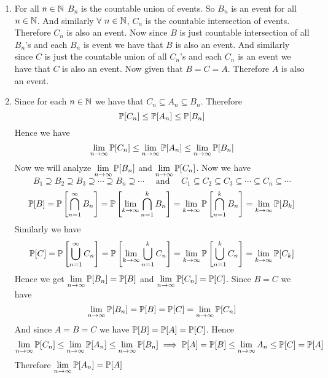 \documentclass[a4paper, 11pt]{article}
\begin{document}
{\begin{enumerate}[label=(\alph*)]
		\item For all $n\in\mathbb{N}$ $B_n$ is the countable union of events. So $B_n$ is an event for all $n\in\mathbb{N}$. And similarly $\forall\ n\in\mathbb{N}$, $C_n$ is the countable intersection of events. Therefore $C_n$ is also an event. Now since $B$ is just countable intersection of all $B_n$'s and each $B_n$ is event we have that $B$ is also an event. And similarly since $C$ is just the countable union of all $C_n$'s and each $C_n$ is an event we have that $C$ is also an event. Now given that $B=C=A$. Therefore $A$ is also an event.
		\item Since for each $n\in \mathbb{N}$ we have that $C_n\subseteq A_n\subseteq B_n$. Therefore $$\mathbb{P}[C_n]\leq \mathbb{P}[A_n]\leq \mathbb{P}[B_n]$$Hence we have $$\lim_{n\to\infty}\mathbb{P}[C_n]\leq\lim_{n\to\infty}\mathbb{P}[A_n]\leq \lim_{n\to\infty}\mathbb{P}[B_n]$$Now we will analyze $\lim\limits_{n\to\infty}\mathbb{P}[B_n]$ and $\lim\limits_{n\to \infty}\mathbb{P}[C_n]$. Now we have $$B_1\supseteq B_2\supseteq B_3\supseteq \cdots\supseteq B_n\supseteq \cdots\quad\text{ and }\quad C_1\subseteq C_2\subseteq C_3\subseteq \cdots\subseteq C_n\subseteq \cdots$$ \begin{align*}
			\mathbb{P}[B]=\mathbb{P}\left[\bigcap_{n=1}^{\infty}B_n \right]=\mathbb{P}\left[ \lim_{k\to\infty}\bigcap_{n=1}^kB_n \right]=\lim_{k\to\infty}\mathbb{P}\left[ \bigcap_{n=1}^kB_n \right]=\lim_{k\to\infty}\mathbb{P}[B_k]
		\end{align*}Similarly we have \begin{align*}
		\mathbb{P}[C]=\mathbb{P}\left[\bigcup_{n=1}^{\infty}C_n \right]=\mathbb{P}\left[ \lim_{k\to\infty}\bigcup_{n=1}^kC_n \right]=\lim_{k\to\infty}\mathbb{P}\left[ \bigcup_{n=1}^kC_n \right]=\lim_{k\to\infty}\mathbb{P}[C_k]
	\end{align*}Hence we get $\lim\limits_{n\to\infty}\mathbb{P}[B_n]=\mathbb{P}[B]$ and $\lim\limits_{n\to\infty}\mathbb{P}[C_n]=\mathbb{P}[C]$. Since $B=C$ we have $$\lim\limits_{n\to\infty}\mathbb{P}[B_n]=\mathbb{P}[B]=\mathbb{P}[C]=\lim\limits_{n\to\infty}\mathbb{P}[C_n]$$And since $A=B=C$ we have $\mathbb{P}[B]=\mathbb{P}[A]=\mathbb{P}[C]$. Hence $$\lim_{n\to\infty}\mathbb{P}[C_n]\leq\lim_{n\to\infty}\mathbb{P}[A_n]\leq \lim_{n\to\infty}\mathbb{P}[B_n]\implies \mathbb{P}[A]=\mathbb{P}[B]\leq\lim_{n\to\infty}A_n\leq \mathbb{P}[C]=\mathbb{P}[A]$$Therefore $\lim\limits_{n\to\infty}\mathbb{P}[A_n]= \mathbb{P}[A]$
	\end{enumerate}
}

\end{document}
